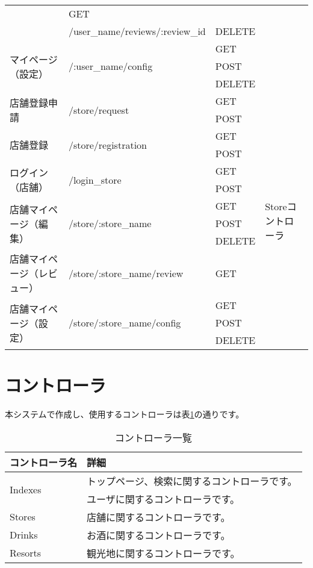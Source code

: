 \documentclass[a4j,titlepage]{jarticle}
\begin{document}
\begin{table}[!htbp]
\begin{center}
\begin{tabular}{|l|l|l|p{4cm}|}
& GET & \\\cline{2-3}
 & /user\_name/reviews/:review\_id & DELETE & \\\cline{1-3}
\multirow{3}{*}{マイページ（設定）} & \multirow{3}{*}{/:user\_name/config}
& GET & \\\cline{3-3}
 & & POST & \\\cline{3-3}
 & & DELETE & \\\hline
 \multirow{2}{*}{店舗登録申請} & \multirow{2}{*}{/store/request}
 & GET & \multirow{13}{*}{Storeコントローラ} \\\cline{3-3}
  & & POST &\\\cline{1-3}
 \multirow{2}{*}{店舗登録} & \multirow{2}{*}{/store/registration}
 & GET &\\\cline{3-3}
  & & POST &\\\cline{1-3}
 \multirow{2}{*}{ログイン（店舗）} & \multirow{2}{*}{/login\_store}
 & GET & \\\cline{3-3}
  & & POST & \\\cline{1-3}
\multirow{3}{*}{店舗マイページ（編集）}& \multirow{3}{*}{/store/:store\_name}
& GET & \\\cline{3-3}
 & & POST & \\\cline{3-3}
 & & DELETE & \\\cline{1-3}
店舗マイページ（レビュー） & /store/:store\_name/review
& GET & \\\cline{1-3}
\multirow{3}{*}{店舗マイページ（設定）} & \multirow{3}{*}{/store/:store\_name/config}
& GET & \\\cline{3-3}
 & & POST & \\\cline{3-3}
 & & DELETE & \\\hline
\end{tabular}
\end{center}
\end{table}

\section{コントローラ}
本システムで作成し、使用するコントローラは表\ref{controller}の通りです。

\begin{table}[!htbp]
\caption{コントローラ一覧}
\label{controller}
\small
\begin{center}
\begin{tabular}{|l|p{5cm}|}\hline
コントローラ名 & 詳細 \\\hline\hline
\multirow{2}{*}{Indexes} & トップページ、検索に関するコントローラです。 \\\hline
Users & ユーザに関するコントローラです。 \\\hline
Stores & 店舗に関するコントローラです。 \\\hline
Drinks & お酒に関するコントローラです。 \\\hline
Resorts & 観光地に関するコントローラです。 \\\hline
\end{tabular}
\end{center}
\end{table}
\end{document}
